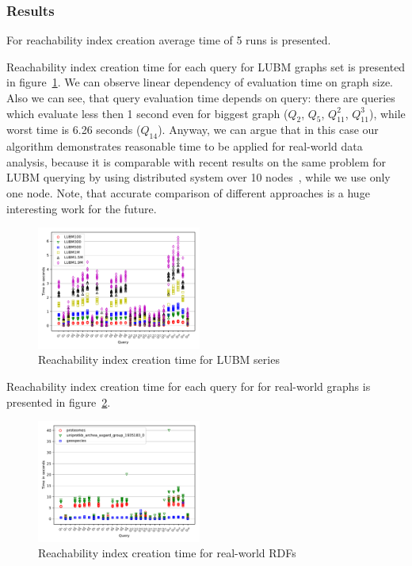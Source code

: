 \subsubsection{Results}

For reachability index creation average time of 5 runs is presented.

Reachability index creation time for each query for LUBM graphs set is presented in figure~\ref{fig:lubm_all_qs}.
We can observe linear dependency of evaluation time on graph size.
Also we can see, that query evaluation time depends on query: there are queries which evaluate less then 1 second even for biggest graph ($Q_2$, $Q_5$, $Q_{11}^2$, $Q_{11}^3$), while worst time is 6.26 seconds ($Q_{14}$).
Anyway, we can argue that in this case our algorithm demonstrates reasonable time to be applied for real-world data analysis, because it is comparable with recent results on the same problem for LUBM querying by using distributed system over 10 nodes~\cite{Wang2019}, while we use only one node. 
Note, that accurate comparison of different approaches is a huge interesting work for the future.

\begin{figure}
   \includegraphics[width=0.48\textwidth]{data/LUBM_all.pdf}
   \caption{Reachability index creation time for LUBM series}
   \label{fig:lubm_all_qs}
\end{figure}


Reachability index creation time for each query for for real-world graphs is presented in figure~\ref{fig:other_all_qs}.

\begin{figure}
   \includegraphics[width=0.48\textwidth]{data/other_all.pdf}
   \caption{Reachability index creation time for real-world RDFs}
   \label{fig:other_all_qs}
\end{figure}

